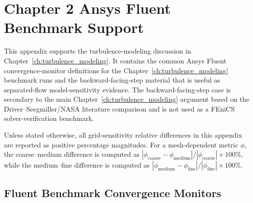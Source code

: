 \chapter{Chapter 2 Ansys Fluent Benchmark Support}
\label{app:A_backstep_benchmark}

This appendix supports the turbulence-modeling discussion in Chapter~\ref{ch:turbulence_modeling}. It contains the common Ansys Fluent convergence-monitor definitions for the Chapter~\ref{ch:turbulence_modeling} benchmark runs and the backward-facing-step material that is useful as separated-flow model-sensitivity evidence. The backward-facing-step case is secondary to the main Chapter~\ref{ch:turbulence_modeling} argument based on the Driver--Seegmiller/NASA literature comparison and is not used as a FEniCS solver-verification benchmark.

Unless stated otherwise, all grid-sensitivity relative differences in this appendix are reported as positive percentage magnitudes. For a mesh-dependent metric $\phi$, the coarse--medium difference is computed as $|\phi_{\mathrm{coarse}}-\phi_{\mathrm{medium}}|/|\phi_{\mathrm{coarse}}|\times100\%$, while the medium--fine difference is computed as $|\phi_{\mathrm{medium}}-\phi_{\mathrm{fine}}|/|\phi_{\mathrm{fine}}|\times100\%$.

\section{Fluent Benchmark Convergence Monitors}
\label{sec:app_A_ch2_fluent_convergence}


